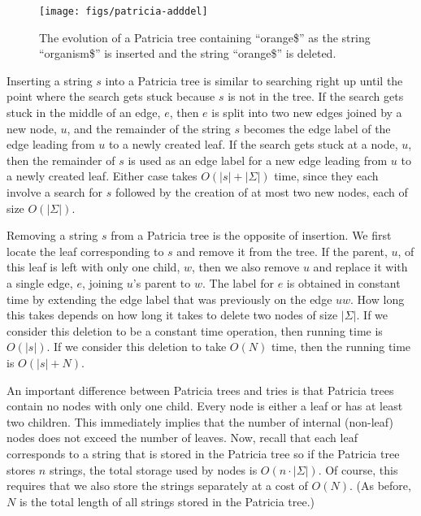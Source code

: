 \begin{figure}
  \begin{center}
    \texttt{[image: figs/patricia-adddel]}
  \end{center}
  \caption{The evolution of a Patricia tree containing ``orange\$'' as the string ``organism\$'' is inserted and the string ``orange\$'' is deleted.}
\end{figure}

Inserting a string $s$ into a Patricia tree is similar to searching
right up until the point where the search gets stuck because $s$ is
not in the tree.  If the search gets stuck in the middle of an edge,
$e$, then $e$ is split into two new edges joined by a new node, $u$,
and the remainder of the string $s$ becomes the edge label of the edge
leading from $u$ to a newly created leaf.  If the search gets stuck at
a node, $u$, then the remainder of $s$ is used as an edge label for a
new edge leading from $u$ to a newly created leaf.  Either case takes
$O(|s|+|\Sigma|)$ time, since they each involve a search for $s$ followed
by the creation of at most two new nodes, each of size $O(|\Sigma|)$.

Removing a string $s$ from a Patricia tree is the opposite of insertion.
We first locate the leaf corresponding to $s$ and remove it from the
tree.  If the parent, $u$, of this leaf is left with only one child,
$w$, then we also remove $u$ and replace it with a single edge,
$e$, joining $u$'s parent to $w$.  The label for $e$ is obtained in
constant time by extending the edge label that was previously on the
edge $uw$. How long this takes depends on how long it takes to delete
two nodes of size $|\Sigma|$.  If we consider this deletion to be a constant
time operation, then running time is $O(|s|)$.  If we consider this
deletion to take $O(N)$ time, then the running time is $O(|s|+N)$.

An important difference between Patricia trees and tries is that Patricia
trees contain no nodes with only one child.  Every node is either a leaf
or has at least two children.  This immediately implies that the number
of internal (non-leaf) nodes does not exceed the number of leaves.
Now, recall that each leaf corresponds to a string that is stored in
the Patricia tree so if the Patricia tree stores $n$ strings, the total
storage used by nodes is $O(n\cdot|\Sigma|)$.  Of course, this requires
that we also store the strings separately at a cost of $O(N)$. (As before,
$N$ is the total length of all strings stored in the Patricia tree.)


